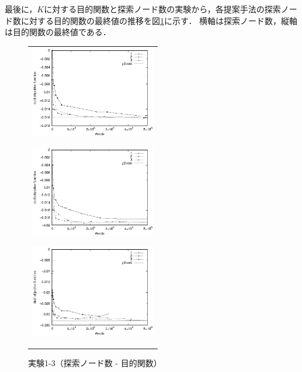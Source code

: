 最後に，$K$に対する目的関数と探索ノード数の実験から，各提案手法の探索ノード数に対する目的関数の最終値の推移を図\ref{1-3}に示す．
横軸は探索ノード数，縦軸は目的関数の最終値である．
\begin{figure}[t]
	\begin{center}
		\begin{tabular}{c}
			\begin{minipage}{0.33\hsize}
				\begin{center}
					\includegraphics[width=55mm]{cpdb/purpose_node_1.eps}
				\end{center}
				\subcaption{$\nu = 0.1$}
				\label{fig:7}
			\end{minipage}
			\begin{minipage}{0.33\hsize}
				\begin{center}
					\includegraphics[width=55mm]{cpdb/purpose_node_3.eps}
				\end{center}
				\subcaption{$\nu = 0.3$}
				\label{fig:8}
			\end{minipage}
			\begin{minipage}{0.33\hsize}
				\begin{center}
					\includegraphics[width=55mm]{cpdb/purpose_node_5.eps}
				\end{center}
				\subcaption{$\nu = 0.5$}
				\label{fig:9}
			\end{minipage}
		\end{tabular}
		\caption{実験1-3（探索ノード数 - 目的関数）}
		\label{1-3}
	\end{center}
\end{figure}

